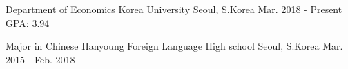

\begin{cventries}

  \cventry
    {Department of Economics} %
    {Korea University} %
    {Seoul, S.Korea} %
    {Mar. 2018 - Present} %
    {GPA: 3.94}

  \cventry
    {Major in Chinese} %
    {Hanyoung Foreign Language High school} %
    {Seoul, S.Korea} %
    {Mar. 2015 - Feb. 2018} %
    {}
\vspace{-5mm}
\end{cventries}

